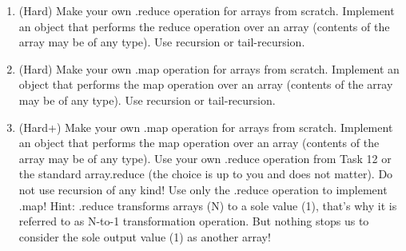\documentclass[12pt]{book}
\begin{document}
\begin{enumerate}
    \item (Hard) Make your own .reduce operation for arrays from scratch. Implement an object that performs the reduce operation over an array (contents of the array may be of any type). Use recursion or tail-recursion.
    \item (Hard) Make your own .map operation for arrays from scratch. Implement an object that performs the map operation over an array (contents of the array may be of any type). Use recursion or tail-recursion.
    \item (Hard+) Make your own .map operation for arrays from scratch. Implement an object that performs the map operation over an array (contents of the array may be of any type). Use your own .reduce operation from Task 12 or the standard array.reduce (the choice is up to you and does not matter). Do not use recursion of any kind! Use only the .reduce operation to implement .map! Hint: .reduce transforms arrays (N) to a sole value (1), that’s why it is referred to as N-to-1 transformation operation. But nothing stops us to consider the sole output value (1) as another array!
\end{enumerate}
\end{document}
